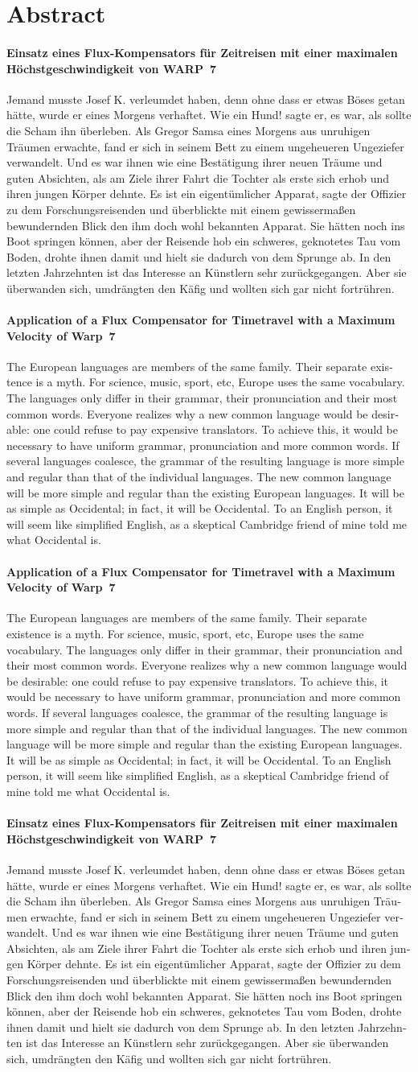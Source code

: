 \documentclass[open=right,  %
    paper=a4,               %
    fontsize=11pt,          %
    headings=small,         %
    headsepline=true,       %
    footsepline=false,      %
    bibliography=totoc,     %
    twoside=true,             %
    DIV=7,                  %
    chapterprefix=true,     %
    cleardoublepage=plain]{scrbook}
\newcommand{\hdmtitelde}{Einsatz eines Flux-Kompensators für Zeitreisen mit einer maximalen Höchstgeschwindigkeit von WARP~7}
\newcommand{\hdmtitelen}{Application of a Flux Compensator for Timetravel with a Maximum Velocity of Warp~7}
\newcommand{\hdmabstractde}{Jemand musste Josef K. verleumdet haben, denn ohne dass er etwas Böses getan hätte, wurde er eines Morgens verhaftet. Wie ein Hund! sagte er, es war, als sollte die Scham ihn überleben. Als Gregor Samsa eines Morgens aus unruhigen Träumen erwachte, fand er sich in seinem Bett zu einem ungeheueren Ungeziefer verwandelt. Und es war ihnen wie eine Bestätigung ihrer neuen Träume und guten Absichten, als am Ziele ihrer Fahrt die Tochter als erste sich erhob und ihren jungen Körper dehnte. Es ist ein eigentümlicher Apparat, sagte der Offizier zu dem Forschungsreisenden und überblickte mit einem gewissermaßen bewundernden Blick den ihm doch wohl bekannten Apparat. Sie hätten noch ins Boot springen können, aber der Reisende hob ein schweres, geknotetes Tau vom Boden, drohte ihnen damit und hielt sie dadurch von dem Sprunge ab. In den letzten Jahrzehnten ist das Interesse an Künstlern sehr zurückgegangen. Aber sie überwanden sich, umdrängten den Käfig und wollten sich gar nicht fortrühren.}
\newcommand{\hdmabstracten}{The European languages are members of the same family. Their separate existence is a myth. For science, music, sport, etc, Europe uses the same vocabulary. The languages only differ in their grammar, their pronunciation and their most common words. Everyone realizes why a new common language would be desirable: one could refuse to pay expensive translators. To achieve this, it would be necessary to have uniform grammar, pronunciation and more common words. If several languages coalesce, the grammar of the resulting language is more simple and regular than that of the individual languages. The new common language will be more simple and regular than the existing European languages. It will be as simple as Occidental; in fact, it will be Occidental. To an English person, it will seem like simplified English, as a skeptical Cambridge friend of mine told me what Occidental is.}
\begin{document}
\cleardoublepage

\chapter*{Abstract}

%
{
  \subsubsection*{\hdmtitelde}
  \hdmabstractde
  \begin{otherlanguage}{english}
    \subsubsection*{\hdmtitelen}
    \hdmabstracten
  \end{otherlanguage}
}
{
  \subsubsection*{\hdmtitelen}
  \hdmabstracten
  \begin{otherlanguage}{ngerman}
    \subsubsection*{\hdmtitelde}
    \hdmabstractde
  \end{otherlanguage}
} 

\cleardoublepage
{}
\tableofcontents
\cleardoublepage

\onehalfspacing


\label{lastpage}

\cleardoublepage 

\begingroup
\cleardoublepage 
\let\clearpage\relax %
\printbibliography 
\endgroup

\addchap{\hdmabbreviations}

\end{document}
